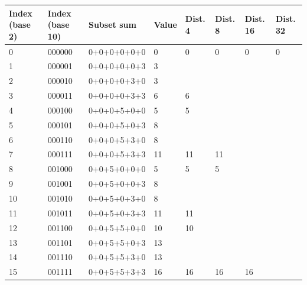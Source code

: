 \documentclass[12pt]{extarticle}
\begin{document}
\begin{center}
\begin{tabular}{ | m{1.5cm} | m{1.7cm} | m{3cm} | m{1.2cm} | m{1.3cm} | m{1.3cm} | m{1.5cm} | m{1.5cm} |}
 \hline
 Index (base 2) & Index (base 10) & Subset sum & Value & Dist. 4 & Dist. 8 & Dist. 16 & Dist. 32\\
 \hline
 0 & 000000 & 0+0+0+0+0+0 & 0 & 0                  & 0                     & 0                   & 0\\
 \cline{1-4}
 1 & 000001 & 0+0+0+0+0+3 & 3 & \multirow{2}{*}{ } & \multirow{6}{*}{ }    & \multirow{14}{*}{}  & \multirow{30}{*}{}\\
 \cline{1-4}
 2 & 000010 & 0+0+0+0+3+0 & 3 &                    &                       &                     &\\
 \cline{1-4}
 3 & 000011 & 0+0+0+0+3+3 & 6 &                  6 &                       &                     &\\
 \cline{1-5}
 4 & 000100 & 0+0+0+5+0+0 & 5 &                  5 &                       &                     &\\
 \cline{1-4}
 5 & 000101 & 0+0+0+5+0+3 & 8 & \multirow{2}{*}{ } &                       &                     &\\
 \cline{1-4}
 6 & 000110 & 0+0+0+5+3+0 & 8 &                    &                       &                     &\\
 \cline{1-4}
 7 & 000111 & 0+0+0+5+3+3 & 11 &                11 & 11                    &                     &\\
 \cline{1-6}

 8 & 001000 & 0+0+5+0+0+0 & 5 & 5                  & 5                     &                     &\\
 \cline{1-4}
 9 & 001001 & 0+0+5+0+0+3 & 8 & \multirow{2}{*}{ } & \multirow{6}{*}{ }    &                     &\\
 \cline{1-4}
 10 & 001010 & 0+0+5+0+3+0 & 8 &                   &                       &                     &\\
 \cline{1-4}
 11 & 001011 & 0+0+5+0+3+3 & 11 &               11 &                       &                     &\\
 \cline{1-5}
 12 & 001100 & 0+0+5+5+0+0 & 10 &               10 &                       &                     &\\
 \cline{1-4}
 13 & 001101 & 0+0+5+5+0+3 & 13 & \multirow{2}{*}{ } &                     &                     &\\
 \cline{1-4}
 14 & 001110 & 0+0+5+5+3+0 & 13 &                    &                     &                     &\\
 \cline{1-4}
 15 & 001111 & 0+0+5+5+3+3 & 16 &                 16 & 16                  & 16                  &\\
 \cline{1-7}


\end{tabular}
\end{center}
\end{document}

